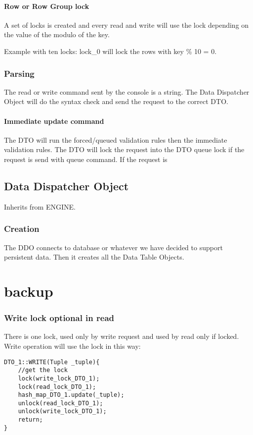 \documentclass[a4paper]{article}
\begin{document}
\paragraph{Row or Row Group lock}
A set of locks is created and every read and write will use the lock depending
on the value of the modulo of the key.

Example with ten locks: lock\_0 will lock the rows with key \% 10 = 0.

\subsubsection{Parsing}
The read or write command sent by the console is a string. The Data Dispatcher
Object will do the syntax check and send the request to the correct DTO.
\paragraph{Immediate update command}
The DTO will run the forced/queued validation rules then the immediate
validation rules.
The DTO will lock the request into the DTO queue lock if the
request is send with queue command. If the request is 

\subsection{Data Dispatcher Object}

Inherits from ENGINE. 
\subsubsection{Creation}
The DDO connects to database or whatever we have decided to support persistent
data. Then it creates all the Data Table Objects.


\section{backup}

\subsubsection{Write lock optional in read}
There is one lock, used only by write request and used by read only if locked.
Write operation will use the lock in this way:

\begin{verbatim}
DTO_1::WRITE(Tuple _tuple){
    //get the lock
    lock(write_lock_DTO_1);
    lock(read_lock_DTO_1);
    hash_map_DTO_1.update(_tuple);
    unlock(read_lock_DTO_1);
    unlock(write_lock_DTO_1); 
    return;
}
\end{verbatim}
\end{document}
